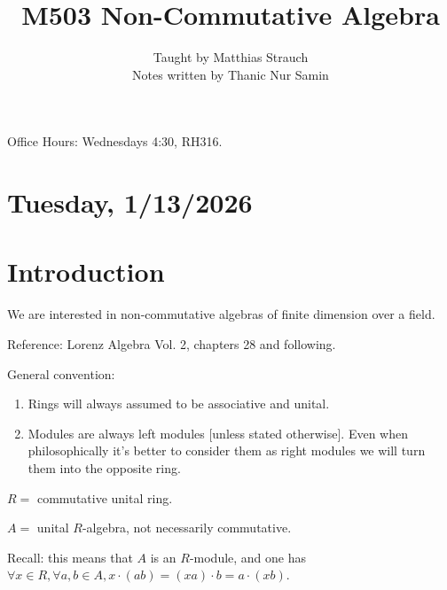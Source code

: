 \documentclass{article}
\title{M503 Non-Commutative Algebra}
\author{Taught by Matthias Strauch \\ Notes written by Thanic Nur Samin}
\date{}
\theoremstyle{definition}
\theoremstyle{plain}
\theoremstyle{remark}
\begin{document}
    \maketitle

    \tableofcontents

    Office Hours: Wednesdays 4:30, RH316.

    \section*{Tuesday, 1/13/2026}
    
    \section{Introduction}

    We are interested in non-commutative algebras of finite dimension over a field.

    Reference: Lorenz Algebra Vol. 2, chapters 28 and following.

    General convention:

    \begin{enumerate}[label=\roman*)]
        \item Rings will always assumed to be associative and unital.
        \item Modules are always left modules [unless stated otherwise]. Even when philosophically it's better to consider them as right modules we will turn them into the opposite ring.
    \end{enumerate} 

    \(R =\) commutative unital ring.

    \(A =\) unital \(R\)-algebra, not necessarily commutative.

    Recall: this means that \(A\) is an \(R\)-module, and one has \(\forall x\in R, \forall a,b\in A, x \cdot (ab) = (xa) \cdot b = a \cdot (xb)\).
\end{document}
